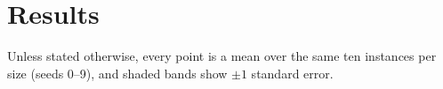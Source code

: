 
\section{Results}
\label{sec:results}

Unless stated otherwise, every point is a mean over the same ten instances per size (seeds 0--9), and shaded bands show $\pm 1$ standard error.







